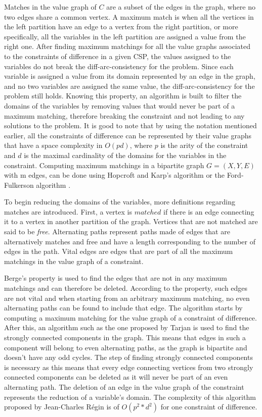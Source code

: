 \documentclass{l4proj}
\begin{document}
\noindent Matches in the value graph of $C$ are a subset of the edges in the graph, where no two edges share a common vertex. A maximum match is when all the vertices in the left partition have an edge to a vertex from the right partition, or more specifically, all the variables in the left partition are assigned a value from the right one.
After finding maximum matchings for all the value graphs associated to the constraints of difference in a given CSP, the values assigned to the variables do not break the diff-arc-consistency for the problem. Since each variable is assigned a value from its domain represented by an edge in the graph, and no two variables are assigned the same value, the diff-arc-consistency for the problem still holds. Knowing this property, an algorithm is built to filter the domains of the variables by removing values that would never be part of a maximum matching, therefore breaking the constraint and not leading to any solutions to the problem. It is good to note that by using the notation mentioned earlier, all the constraints of difference can be represented by their value graphs that have a space complexity in $O(pd)$, where $p$ is the arity of the constraint and $d$ is the maximal cardinality of the domains for the variables in the constraint. Computing maximum matchings in a bipartite graph $G = (X, Y, E)$ with m edges, can be done using Hopcroft and Karp’s algorithm \cite{hopcroft1973n} or the Ford-Fulkerson algorithm \cite{ford1956maximal}. 

\noindent To begin reducing the domains of the variables, more definitions regarding matches are introduced. First, a vertex is $matched$ if there is an edge connecting it to a vertex in another partition of the graph. Vertices that are not matched are said to be \textit{free}. Alternating paths represent paths made of edges that are alternatively matches and free and have a length corresponding to the number of edges in the path. Vital edges are edges that are part of all the maximum matchings in the value graph of a constraint.

\noindent Berge’s property \cite{berge1957two} is used to find the edges that are not in any maximum matchings and can therefore be deleted. According to the property, such edges are not vital and when starting from an arbitrary maximum matching, no even alternating paths can be found to include that edge. The algorithm starts by computing a maximum matching for the value graph of a constraint of difference. After this, an algorithm such as the one proposed by Tarjan \cite{tarjan1972depth} is used to find the strongly connected components in the graph. This means that edges in such a component will belong to even alternating paths, as the graph is bipartite and doesn’t have any odd cycles. The step of finding strongly connected components is necessary as this means that every edge connecting vertices from two strongly connected components can be deleted as it will never be part of an even alternating path. The deletion of an edge in the value graph of the constraint represents the reduction of a variable’s domain. The complexity of this algorithm proposed by Jean-Charles R\'egin \cite{regin1994filtering} is of $O(p^2 * d^2)$ for one constraint of difference.
\end{document}
